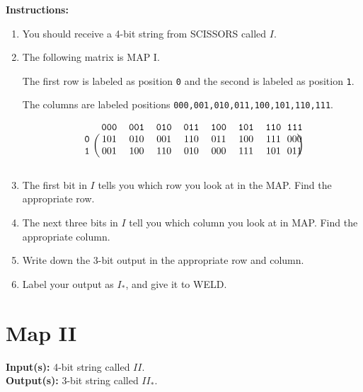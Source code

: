 \documentclass[12pt]{amsart}
\theoremstyle{plain}
\theoremstyle{definition}
\theoremstyle{remark}
\begin{document}
\textbf{Instructions:}
\begin{enumerate}[1.]
	\item You should receive a 4-bit string from SCISSORS called $I$.
	\item The following matrix is  MAP I.
	
	The first row is labeled as position \texttt{0} and the second is labeled as position \texttt{1}.
	
	The columns are labeled positions \texttt{000,001,010,011,100,101,110,111}.
	
	\begin{center}\[
	\begin{blockarray}{ccccccccc}
	&&\texttt{000}&\texttt{001}&\texttt{010}&\texttt{011}&\texttt{100}&\texttt{101}&\texttt{110}&\texttt{111}\\
	\begin{block}{c(cccccccc)}
	&\texttt{0} & 101 & 010 & 001 & 110 & 011 & 100 & 111 & 000\\
	&\texttt{1} &001 & 100 & 110 & 010 & 000 & 111 & 101 & 011\\
	\end{block}
	\end{blockarray}
	\] \end{center}

	\item The first bit in $I$ tells you which row you look at in the MAP.  Find the appropriate row.
	\item The next three bits in $I$ tell you which column you look at in MAP.  Find the appropriate column.
	\item Write down the 3-bit output in the appropriate row and column.
	\item Label your output as $I_*$, and give it to WELD.
\end{enumerate}

\newpage
\section*{Map II}
\textbf{Input(s):}  4-bit string called $II$.\\

\textbf{Output(s):} 3-bit string called $II_*$. \\
\end{document}
